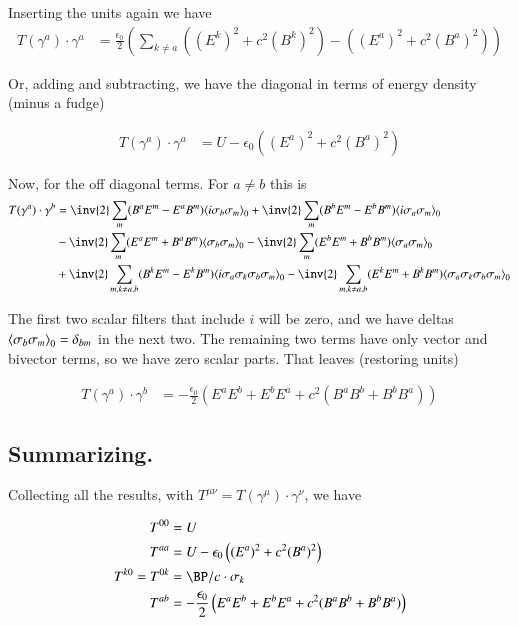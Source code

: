 \documentclass{article}
\begin{document}
Inserting the units again we have
\begin{align}
T(\gamma^a) \cdot \gamma^a 
&= 
\frac{\epsilon_0}{2} \left( \sum_{k \ne a} \left( (E^k)^2 + c^2 (B^k)^2 \right) - \left( (E^a)^2  + c^2 (B^a)^2  \right) \right)
\end{align}

Or, adding and subtracting, we have the diagonal in terms of energy density (minus a fudge) 

\begin{align}
T(\gamma^a) \cdot \gamma^a &= U - \epsilon_0 \left( (E^a)^2  + c^2 (B^a)^2  \right)
\end{align}

Now, for the off diagonal terms.  For $a \ne b$ this is
\begin{align*}
T(\gamma^a) \cdot \gamma^b 
&= 
\inv{2} \sum_m (B^a E^m - E^a B^m) \gpgradezero{ i \sigma_b \sigma_m } 
+\inv{2} \sum_{m}(B^b E^m - E^b B^m) \gpgradezero{ i \sigma_a \sigma_m } \\
&- \inv{2} \sum_m (E^a E^m + B^a B^m) \gpgradezero{ \sigma_b \sigma_m } 
- \inv{2} \sum_{m}(E^b E^m + B^b B^m) \gpgradezero{ \sigma_a \sigma_m } \\
&+\inv{2} \sum_{m, k \ne a,b}(B^k E^m - E^k B^m) \gpgradezero{ i \sigma_a \sigma_k \sigma_b \sigma_m } 
- \inv{2} \sum_{m, k \ne a,b}(E^k E^m + B^k B^m) \gpgradezero{ \sigma_a \sigma_k \sigma_b \sigma_m } \\
\end{align*}

The first two scalar filters that include $i$ will be zero, and we have deltas
${\left\langle{{ \sigma_b \sigma_m }}\right\rangle}_{0} = \delta_{bm}$ in the next two.
The remaining two terms have only vector and bivector terms, so we have zero scalar parts.
That leaves (restoring units)

\begin{align}
T(\gamma^a) \cdot \gamma^b 
&= - \frac{\epsilon_0}{2} \left( E^a E^b + E^b E^a + c^2 (B^a B^b + B^b B^a) \right)
\end{align}

\subsection{ Summarizing. }

Collecting all the results, with $T^{\mu\nu} = T(\gamma^\mu) \cdot \gamma^\nu$, we have

\begin{align}
T^{00} &= U \\
T^{aa} &= U - \epsilon_0 \left( (E^a)^2  + c^2 (B^a)^2  \right) \\
T^{k0} = T^{0k} &= \BP/c \cdot \sigma_k \\
T^{ab} &= - \frac{\epsilon_0}{2} \left( E^a E^b + E^b E^a + c^2 (B^a B^b + B^b B^a) \right)
\end{align}
\end{document}
